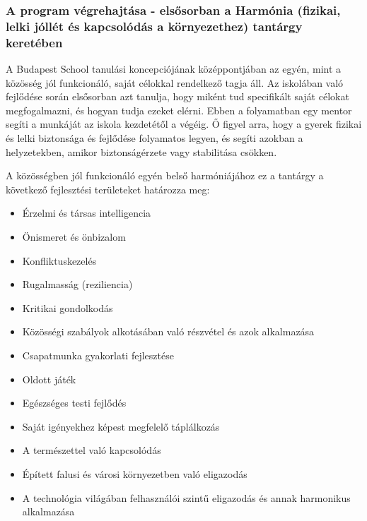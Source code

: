 \subsubsection{A program végrehajtása - elsősorban a Harmónia (fizikai,
      lelki jóllét és kapcsolódás a környezethez) tantárgy
      keretében}
A Budapest School tanulási koncepciójának középpontjában az egyén, mint
a közösség jól funkcionáló, saját célokkal rendelkező tagja áll. Az
iskolában való fejlődése során elsősorban azt tanulja, hogy miként tud
specifikált saját célokat megfogalmazni, és hogyan tudja ezeket elérni.
Ebben a folyamatban egy mentor segíti a munkáját az iskola kezdetétől a
végéig. Ő figyel arra, hogy a gyerek fizikai és lelki biztonsága és
fejlődése folyamatos legyen, és segíti azokban a helyzetekben, amikor
biztonságérzete vagy stabilitása csökken.

A közösségben jól funkcionáló egyén belső harmóniájához ez a tantárgy a
következő fejlesztési területeket határozza meg:

\begin{itemize}

      \item
            Érzelmi és társas intelligencia
      \item
            Önismeret és önbizalom
      \item
            Konfliktuskezelés
      \item
            Rugalmasság (reziliencia)
      \item
            Kritikai gondolkodás
      \item
            Közösségi szabályok alkotásában való részvétel és azok alkalmazása
      \item
            Csapatmunka gyakorlati fejlesztése
      \item
            Oldott játék
      \item
            Egészséges testi fejlődés
      \item
            Saját igényekhez képest megfelelő táplálkozás
      \item
            A természettel való kapcsolódás
      \item
            Épített falusi és városi környezetben való eligazodás
      \item
            A technológia világában felhasználói szintű eligazodás és annak
            harmonikus alkalmazása
\end{itemize}


